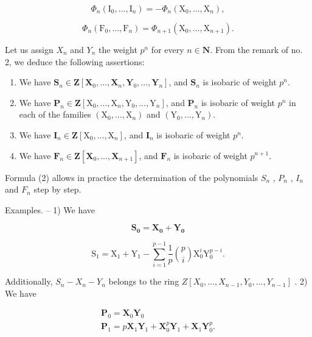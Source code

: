 \[
\Phi_ {n} (\mathrm{I} _ {0}, \dots , \mathrm{I} _ {n}) = - \Phi_ {n} (\mathrm{X} _ {0}, \dots , \mathrm{X} _ {n}),\tag{15}
\]

\[
\Phi_ {n} \left(\mathrm{F} _ {0}, \dots , \mathrm{F} _ {n}\right) = \Phi_ {n + 1} \left(\mathrm{X} _ {0}, \dots , \mathrm{X} _ {n + 1}\right).
\]

Let us assign \(X_{n}\) and \(Y_{n}\) the weight \(p^{n}\) for every \(n \in \mathbf{N}\). From the remark of no. 2, we deduce the following assertions:

\begin{enumerate}
\def\labelenumi{\alph{enumi})}
\item
  We have \(\mathbf{S}_n\in \mathbf{Z}[\mathbf{X}_0,\dots ,\mathbf{X}_n,\mathbf{Y}_0,\dots ,\mathbf{Y}_n]\), and \(\mathbf{S}_n\) is isobaric of weight \(p^n\).
\item
  We have \(\mathbf{P}_n\in \mathbf{Z}[\mathrm{X}_0,\dots ,\mathrm{X}_n,\mathrm{Y}_0,\dots ,\mathrm{Y}_n]\), and \(\mathbf{P}_n\) is isobaric of weight \(p^n\) in each of the families \((\mathrm{X}_0,\dots ,\mathrm{X}_n)\) and \((\mathrm{Y}_0,\dots ,\mathrm{Y}_n)\).
\item
  We have \(\mathbf{I}_n\in \mathbf{Z}[\mathrm{X}_0,\dots ,\mathrm{X}_n]\), and \(\mathbf{I}_n\) is isobaric of weight \(p^n\).
\item
  We have \(\mathbf{F}_n\in \mathbf{Z}[\mathbf{X}_0,\dots ,\mathbf{X}_{n + 1}]\), and \(\mathbf{F}_n\) is isobaric of weight \(p^{n + 1}\).
\end{enumerate}

Formula (2) allows in practice the determination of the polynomials \(S_{n}\) , \(P_{n}\) , \(I_{n}\) and \(F_{n}\) step by step.

Examples. -- 1) We have

\[
\mathbf {S _ {0}} = \mathbf {X _ {0}} + \mathbf {Y _ {0}}
\]

\[
\mathrm{S} _ {1} = \mathrm{X} _ {1} + \mathrm{Y} _ {1} - \sum_ {i = 1} ^ {p - 1} \frac {1}{p} \binom {p} {i} \mathrm{X} _ {0} ^ {i} \mathrm{Y} _ {0} ^ {p - i}.
\]

Additionally, \(S_{n} - X_{n} - Y_{n}\) belongs to the ring \(Z[X_{0}, ..., X_{n-1}, Y_{0}, ..., Y_{n-1}]\) . 2) We have

\[
\begin{array}{l} \mathbf {P} _ {0} = \mathbf {X} _ {0} \mathbf {Y} _ {0} \\ \mathbf {P} _ {1} = p \mathbf {X} _ {1} \mathbf {Y} _ {1} + \mathbf {X} _ {0} ^ {p} \mathbf {Y} _ {1} + \mathbf {X} _ {1} \mathbf {Y} _ {0} ^ {p}. \end{array}
\]

